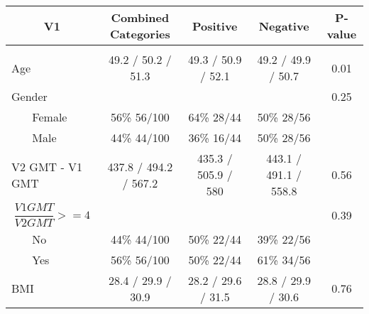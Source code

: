 \begin{table}
\begin{tabular}{lcccc}
\multicolumn{1}{c}{ V1 }&\multicolumn{1}{c}{ Combined Categories }&\multicolumn{1}{c}{ Positive }&\multicolumn{1}{c}{ Negative }&\multicolumn{1}{c}{ P-value }
\\
\hline\\ 
Age&49.2 / 50.2 / 51.3&49.3 / 50.9 / 52.1&49.2 / 49.9 / 50.7&0.01\\
Gender&&&&0.25\\
~~~ Female&56\% 56/100&64\% 28/44&50\% 28/56&\\
~~~ Male&44\% 44/100&36\% 16/44&50\% 28/56&\\
V2 GMT - V1 GMT&437.8 / 494.2 / 567.2&435.3 / 505.9 / 580&443.1 / 491.1 / 558.8&0.56\\
$$\frac{V1 GMT}{V2 GMT} >= 4$$&&&&0.39\\
~~~ No&44\% 44/100&50\% 22/44&39\% 22/56&\\
~~~ Yes&56\% 56/100&50\% 22/44&61\% 34/56&\\
BMI&28.4 / 29.9 / 30.9&28.2 / 29.6 / 31.5&28.8 / 29.9 / 30.6&0.76 \\
\end{tabular}
\caption{}
\end{table} 
